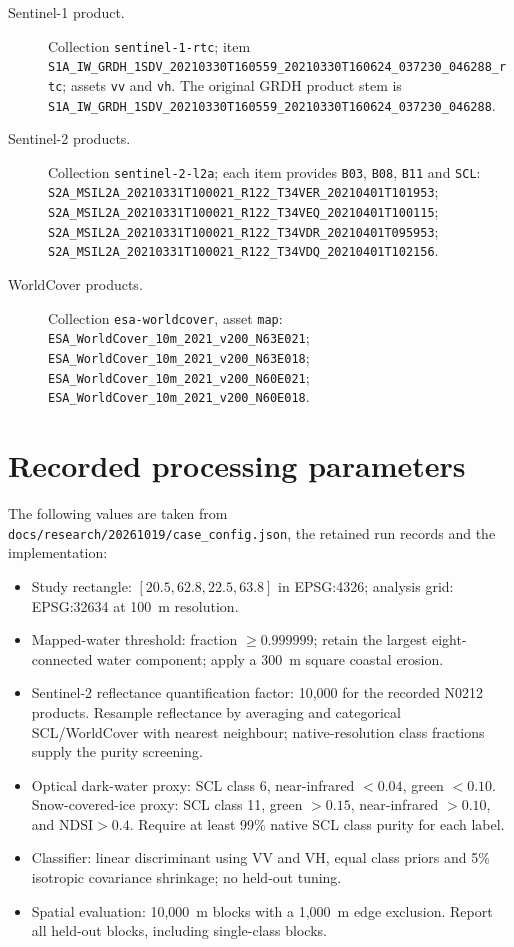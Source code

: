 \begin{description}
\item[Sentinel-1 product.] Collection \texttt{sentinel-1-rtc}; item
\nolinkurl{S1A_IW_GRDH_1SDV_20210330T160559_20210330T160624_037230_046288_rtc};
assets \texttt{vv} and \texttt{vh}. The original GRDH product stem is
\nolinkurl{S1A_IW_GRDH_1SDV_20210330T160559_20210330T160624_037230_046288}.
\item[Sentinel-2 products.] Collection \texttt{sentinel-2-l2a}; each item provides
\texttt{B03}, \texttt{B08}, \texttt{B11} and \texttt{SCL}:
\nolinkurl{S2A_MSIL2A_20210331T100021_R122_T34VER_20210401T101953};
\nolinkurl{S2A_MSIL2A_20210331T100021_R122_T34VEQ_20210401T100115};
\nolinkurl{S2A_MSIL2A_20210331T100021_R122_T34VDR_20210401T095953};
\nolinkurl{S2A_MSIL2A_20210331T100021_R122_T34VDQ_20210401T102156}.
\item[WorldCover products.] Collection \texttt{esa-worldcover}, asset \texttt{map}:
\nolinkurl{ESA_WorldCover_10m_2021_v200_N63E021};
\nolinkurl{ESA_WorldCover_10m_2021_v200_N63E018};
\nolinkurl{ESA_WorldCover_10m_2021_v200_N60E021};
\nolinkurl{ESA_WorldCover_10m_2021_v200_N60E018}.
\end{description}

\section{Recorded processing parameters}

The following values are taken from \texttt{docs/research/20261019/case\_config.json},
the retained run records and the implementation:

\begin{itemize}
\item Study rectangle: \([20.5,62.8,22.5,63.8]\) in EPSG:4326; analysis grid: EPSG:32634
  at 100~m resolution.
\item Mapped-water threshold: fraction \(\geq0.999999\); retain the largest eight-connected
  water component; apply a 300~m square coastal erosion.
\item Sentinel-2 reflectance quantification factor: 10,000 for the recorded N0212 products.
  Resample reflectance by averaging and categorical SCL/WorldCover with nearest neighbour;
  native-resolution class fractions supply the purity screening.
\item Optical dark-water proxy: SCL class 6, near-infrared \(<0.04\), green \(<0.10\).
  Snow-covered-ice proxy: SCL class 11, green \(>0.15\), near-infrared \(>0.10\), and
  \(\mathrm{NDSI}>0.4\). Require at least 99\% native SCL class purity for each label.
\item Classifier: linear discriminant using VV and VH, equal class priors and 5\% isotropic
  covariance shrinkage; no held-out tuning.
\item Spatial evaluation: 10,000~m blocks with a 1,000~m edge exclusion. Report all
  held-out blocks, including single-class blocks.
\end{itemize}

